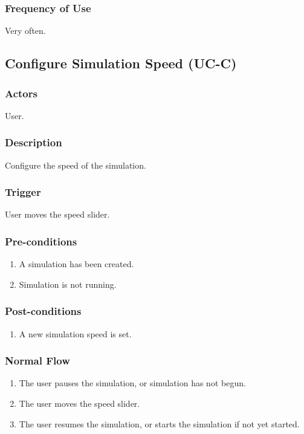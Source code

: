 \documentclass[a4paper,11pt,titlepage]{article}
\begin{document}
\subsubsection{Frequency of Use}
Very often.

\subsection{Configure Simulation Speed (UC-C)}
\subsubsection{Actors}
User.
\subsubsection{Description}
Configure the speed of the simulation.

\subsubsection{Trigger}
User moves the speed slider.

\subsubsection{Pre-conditions}

\begin{enumerate}
  \item A simulation has been created.
  \item Simulation is not running.
\end{enumerate}

\subsubsection{Post-conditions}

\begin{enumerate}
  \item A new simulation speed is set.
\end{enumerate}

\subsubsection{Normal Flow}
\begin{enumerate}
  \item The user pauses the simulation, or simulation has not begun.
  \item The user moves the speed slider.
  \item The user resumes the simulation, or starts the simulation if not yet started.
\end{enumerate}
\end{document}
